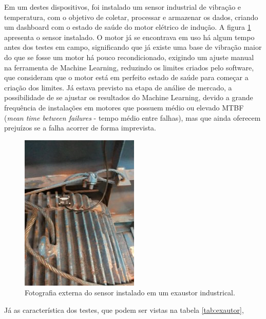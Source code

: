Em um destes dispositivos, foi instalado um sensor industrial de vibração e temperatura, com o objetivo de coletar, processar e armazenar os
dados, criando um dashboard com o estado de saúde do motor elétrico de indução. A figura \ref{fig:sensor_exaustor} apresenta o sensor instalado.
O motor já se encontrava em uso há algum tempo antes dos testes em campo, significando que já existe uma base de vibração maior do que se fosse
um motor há pouco recondicionado, exigindo um ajuste manual na ferramenta de Machine Learning, reduzindo os limites criados pelo software, que
consideram que o motor está em perfeito estado de saúde para começar a criação dos limites. Já estava previsto na etapa de análise de mercado, 
a possibilidade de se ajustar os resultados do Machine Learning, devido a grande frequência de instalações em motores que possuem médio ou
elevado MTBF (\textit{mean time between failures} - tempo médio entre falhas), mas que ainda oferecem prejuízos se a falha acorrer de forma 
imprevista.

\begin{figure}[H]
    \caption{Fotografia externa do sensor instalado em um exaustor industrical.}
    \begin{center}
        \includegraphics[scale=1.1]{metodologia/img/sensor_exaustor.jpg}
    \end{center}
    \label{fig:sensor_exaustor}
\end{figure}

Já as característica dos testes, que podem ser vistas na tabela \ref{tab:exautor}, 

